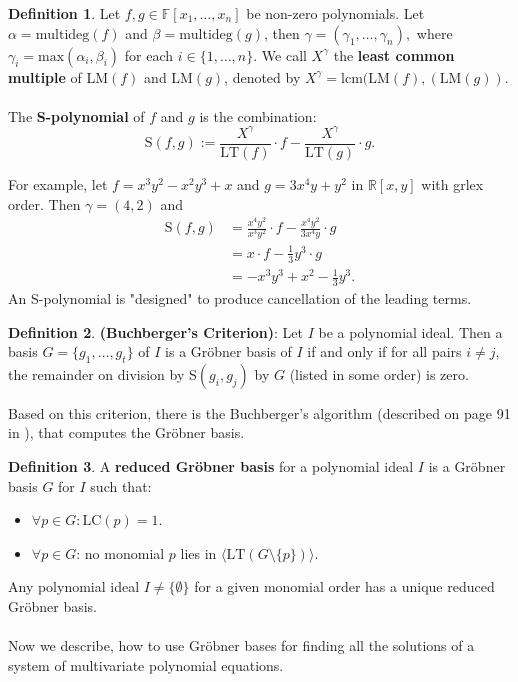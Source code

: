 \documentclass[thesis=M,english]{FITthesis}[2012/10/20]
\theoremstyle{remark}
\theoremstyle{definition}
\newtheorem{DF}{Definition}[section]
\begin{document}
\begin{DF}
Let $f,g \in \mathbb{F}[x_1,\ldots,x_n]$ be non-zero polynomials. Let $\alpha = \text{multideg}(f)$ and $\beta = \text{multideg}(g)$, then ${\gamma = (\gamma_1,\ldots,\gamma_n)},$ where ${\gamma_i = \text{max}(\alpha_i,\beta_i)}$ for each $i \in \{1,\ldots,n\}.$ We call $X^\gamma$ the \textbf{least common multiple} of LM$(f)$ and LM$(g)$, denoted by $X^\gamma = \text{lcm(LM}(f),(\text{LM}(g)).$ \\ \\
\noindent The \textbf{S-polynomial} of $f$ and $g$ is the combination:
$$
\text{S}(f,g) := \frac{X^\gamma}{\text{LT}(f)}\cdot f - \frac{X^\gamma}{\text{LT}(g)}\cdot g.
$$
\end{DF}
\noindent For example, let $f=x^3y^2 - x^2y^3 + x$ and $g = 3x^4y + y^2$ in $\mathbb{R}[x,y]$ with grlex order. Then $\gamma = (4,2)$ and
\begin{align*}
\text{S}(f,g) &= \frac{x^4y^2}{x^3y^2}\cdot f - \frac{x^4y^2}{3x^4y}\cdot g \\
&= x\cdot f - \frac{1}{3}y^3\cdot g \\
&= -x^3y^3 + x^2 - \frac{1}{3}y^3.
\end{align*}
An S-polynomial is "designed" to produce cancellation of the leading terms.
\begin{DF}
\textbf{(Buchberger's Criterion)}: Let $I$ be a polynomial ideal. Then a basis $G = \{g_1,\ldots,g_t\}$ of $I$ is a Gröbner basis of $I$ if and only if for all pairs $i\neq j$, the remainder on division by S$(g_i,g_j)$ by $G$ (listed in some order) is zero.
\end{DF}
\noindent Based on this criterion, there is the Buchberger's algorithm (described on page 91 in \cite{algGeom}), that computes the Gröbner basis.
\begin{DF}
A \textbf{reduced Gröbner basis} for a polynomial ideal $I$ is a Gröbner basis $G$ for $I$ such that:
\begin{itemize}
\item $\forall p \in G: \text{LC}(p) = 1.$
\item $\forall p \in G$: no monomial $p$ lies in $\langle\text{LT}(G \setminus \{p\}) \rangle.$
\end{itemize}
\end{DF}
\noindent Any polynomial ideal $I\neq \{\emptyset\}$ for a given monomial order has a unique reduced Gröbner basis. 
\\
\\
\noindent Now we describe, how to use Gröbner bases for finding all the solutions of a system of multivariate polynomial equations.
\end{document}
